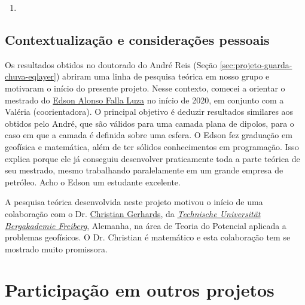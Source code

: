 \begin{enumerate}
	
	\item{}
	
\end{enumerate}

\subsection*{Contextualização e considerações pessoais}

Os resultados obtidos no doutorado do André Reis 
(Seção \ref{sec:projeto-guarda-chuva-eqlayer}) abriram uma linha de pesquisa teórica
em nosso grupo e motivaram o início do presente projeto.
Nesse contexto, comecei a orientar o mestrado do
\href{https://lattes.cnpq.br/4225133150519568}{Edson Alonso Falla Luza} no início
de 2020, em conjunto com a Valéria (coorientadora).
O principal objetivo é deduzir resultados similares aos obtidos pelo André, que são válidos 
para uma camada plana de dipolos, para o caso em que a camada é definida sobre uma esfera.
O Edson fez graduação em geofísica e matemática, além de ter sólidos conhecimentos em 
programação. Isso explica porque ele já conseguiu desenvolver praticamente toda a
parte teórica de seu mestrado, mesmo trabalhando paralelamente em um grande empresa
de petróleo. Acho o Edson um estudante excelente.

\bigskip

\noindent A pesquisa teórica desenvolvida neste projeto motivou o início de uma colaboração com o 
Dr. \href{https://tu-freiberg.de/en/fakult3/gy/mageo/members}{Christian Gerhards},
da \href{https://tu-freiberg.de/universitaet}{\textsl{Technische Universität Bergakademie Freiberg}}, Alemanha, na área de Teoria do Potencial aplicada a problemas geofísicos.
O Dr. Christian é matemático e esta colaboração tem se mostrado muito promissora.




\section{Participação em outros projetos} 
\label{sec:outros-projeto}

